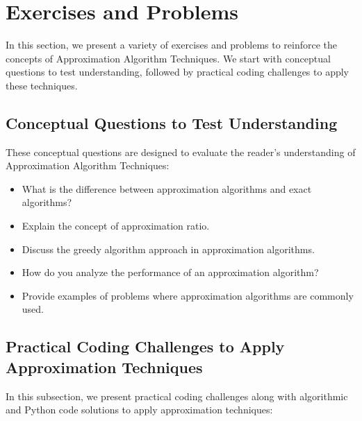 \documentclass[12pt]{book} %
\begin{document}
\section{Exercises and Problems}
In this section, we present a variety of exercises and problems to reinforce the concepts of Approximation Algorithm Techniques. We start with conceptual questions to test understanding, followed by practical coding challenges to apply these techniques.

\subsection{Conceptual Questions to Test Understanding}
These conceptual questions are designed to evaluate the reader's understanding of Approximation Algorithm Techniques:

\begin{itemize}
    \item What is the difference between approximation algorithms and exact algorithms?
    \item Explain the concept of approximation ratio.
    \item Discuss the greedy algorithm approach in approximation algorithms.
    \item How do you analyze the performance of an approximation algorithm?
    \item Provide examples of problems where approximation algorithms are commonly used.
\end{itemize}

\subsection{Practical Coding Challenges to Apply Approximation Techniques}
In this subsection, we present practical coding challenges along with algorithmic and Python code solutions to apply approximation techniques:
\end{document}
